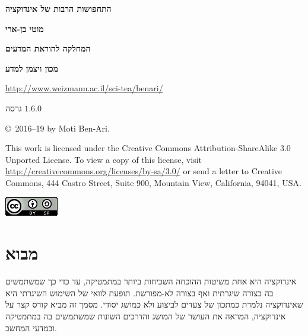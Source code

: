 
\thispagestyle{empty}

\begin{center}
\textbf{\LARGE התחפושות הרבות של אינדוקציה}

\bigskip
\bigskip

\textbf{\Large מוטי בן-ארי}

\bigskip

\textbf{\large המחלקה להוראת המדעים}

\smallskip

\textbf{\large מכון ויצמן למדע}

\bigskip

\url{http://www.weizmann.ac.il/sci-tea/benari/}

\bigskip

\large{גרסה
$1.6.0$}
\end{center}

\bigskip

\begin{center}
\copyright{}\  2016--19 by Moti Ben-Ari.
\end{center}

This work is licensed under the Creative Commons Attribution-ShareAlike 3.0 Unported License. To view a copy of this license, visit \url{http://creativecommons.org/licenses/by-sa/3.0/} or send a letter to Creative Commons, 444 Castro Street, Suite 900, Mountain View, California, 94041, USA.

\begin{center}
\includegraphics[width=.2\textwidth]{../../by-sa.png}
\end{center}


\setcounter{tocdepth}{0}
\tableofcontents


\chapter[מבוא]{\vspace*{-2ex}מבוא}\label{s.intro}

\vspace*{-4ex}

אינדוקציה היא אחת משיטות ההוכחה השכיחות ביותר במתמטיקה, עד כדי כך שמשתמשים בה בצורה שיגרתית ואף בצורה לא-מפורשת. תופעת לוואי של השימוש השיגרתי היא שאינדוקציה נלמדת כמתכון של צעדים לביצוע ולא כמושג יסודי. מסמך זה מביא קורס קצר על אינדוקציה, המראה את העושר של המושג והדרכים השונות שמשתמשים בה במתמטיקה ובמדעי המחשב.

